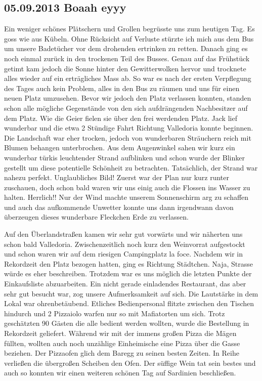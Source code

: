 \subsection{05.09.2013 Boaah eyyy} 
Ein weniger schönes Plätschern und Grollen begrüsste uns zum heutigen Tag.
Es goss wie aus Kübeln.
Ohne Rücksicht auf Verluste stürzte ich mich aus dem Bus um unsere Badetücher vor dem drohenden ertrinken zu retten.
Danach ging es noch einmal zurück in den trockenen Teil des Busses.
Genau auf das Frühstück getimt kam jedoch die Sonne hinter den Gewitterwolken hervor und trocknete alles wieder auf ein erträgliches Mass ab.
So war es nach der ersten Verpflegung des Tages auch kein Problem, alles in den Bus zu räumen und uns für einen neuen Platz umzusehen.
Bevor wir jedoch den Platz verlassen konnten, standen schon alle mögliche Gegenstände von den sich aufdrängenden Nachbesitzer auf dem Platz.
Wie die Geier fielen sie über den frei werdenden Platz.
Jack lief wunderbar und die etwa 2 Stündige Fahrt Richtung Valledoria konnte beginnen.
Die Landschaft war eher trocken, jedoch von wunderbaren Sträuchern reich mit Blumen behangen unterbrochen.
Aus dem Augenwinkel sahen wir kurz ein wunderbar türkis leuchtender Strand aufblinken und schon wurde der Blinker gestellt um diese potentielle Schönheit zu betrachten.
Tatsächlich, der Strand war nahezu perfekt.
Unglaubliches Bild!  Zuerst war der Plan nur kurz runter zuschauen, doch schon bald waren wir uns einig auch die Flossen ins Wasser zu halten.
Herrlich!! Nur der Wind machte unserem Sonnenschirm arg zu schaffen und auch das aufkommende Unwetter konnte uns dann irgendwann davon überzeugen dieses wunderbare Fleckchen Erde zu verlassen. 

Auf den Überlandstraßen kamen wir sehr gut vorwärts und wir näherten uns schon bald Valledoria.
Zwischenzeitlich noch kurz den Weinvorrat aufgestockt und schon waren wir auf dem riesigen Campingplatz la foce.
Nachdem wir in Rekordzeit den Platz bezogen hatten, ging es Richtung Städtchen.
Naja, Strasse würde es eher beschreiben.
Trotzdem war es uns möglich die letzten Punkte der Einkaufsliste abzuarbeiten.
Ein nicht gerade einladendes Restaurant, das aber sehr gut besucht war, zog unsere Aufmerksamkeit auf sich.
Die Lautstärke in dem Lokal war ohrenbetäubend.
Etliches Bedienpersonal flitzte zwischen den Tischen hindurch und 2 Pizzaiolo warfen nur so mit Mafiatorten um sich.
Trotz geschätzten 90 Gästen die alle bedient werden wollten, wurde die Bestellung in Rekordzeit geliefert.
Während wir mit der immens großen Pizza die Mägen füllten, wollten auch noch unzählige Einheimische eine Pizza über die Gasse beziehen.
Der Pizzaofen glich  dem Baregg zu seinen besten Zeiten.
In Reihe verließen die übergroßen Scheiben den Ofen.
Der süffige Wein tat sein bestes und auch so konnten wir einen weiteren schönen Tag auf Sardinien beschließen.  

